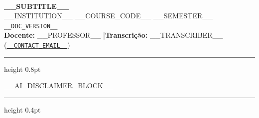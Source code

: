 \documentclass[12pt,a4paper]{article}
\numberwithin{equation}{section}
\begin{document}
\noindent{\sffamily\bfseries\LARGE \textcolor{darkblue}{__TITLE__}}\\[0.25cm]
{\sffamily\large \textbf{__SUBTITLE__}}\\[0.15cm]
{\textsf{\small __INSTITUTION__ \textbullet{} __COURSE_CODE__ \textbullet{} __SEMESTER__ \textbullet{} \texttt{__DOC_VERSION__}}}\\
{\textsf{\small \textbf{Docente:} __PROFESSOR__ \quad|\quad \textbf{Transcrição:} __TRANSCRIBER__ (\href{mailto:__CONTACT_EMAIL__}{\texttt{__CONTACT_EMAIL__}})}}\\
\vspace{0.3em}
{\color{destaqueblue}\hrule height 0.8pt}
\vspace{1em}

__AI_DISCLAIMER_BLOCK__

\tableofcontents
\vspace{1em}
{\color{destaqueblue}\hrule height 0.4pt}
\vspace{1.2em}
\end{document}
